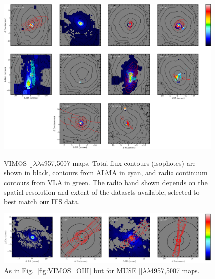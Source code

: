 		\begin{figure}
			\centering
			\includegraphics[width=\textwidth]{chapter5/vimos/Hb.png}
			\caption[VIMOS  maps]{VIMOS []$\lambda\lambda$4957,5007 maps. Total flux contours (isophotes) are shown in black,  contours from ALMA in cyan, and radio continuum contours from VLA in green. The radio band shown depends on the spatial resolution and extent of the datasets available, selected to best match our IFS data.\label{fig:VIMOS_OIII}} 
			
			\vspace{\floatsep}
			\includegraphics[width=\textwidth]{chapter5/muse/Hb.png}
			\caption[MUSE  maps]{As in Fig.\ \ref{fig:VIMOS_OIII} but for MUSE []$\lambda\lambda$4957,5007 maps.\label{fig:MUSE_OIII}} 
			
		\end{figure}

